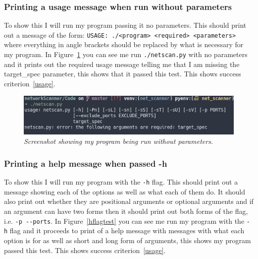 \documentclass[titlepage]{article}
\let\Oldsubsubsection\subsubsection{}
\renewcommand{\subsubsection}{\FloatBarrier\Oldsubsubsection}
\begin{document}
\subsubsection{Printing a usage message when run without parameters}

To show this I will run my program passing it no parameters.
This should print out a message of the form: \verb|USAGE: ./<program> <required> <parameters>|
where everything in angle brackets should be replaced by what is necessary for my program. 
In Figure~\ref{noparametertest} you can see me run \verb|./netscan.py| with no parameters and it
prints out the required usage message telling me that I am missing the target\_spec parameter, this
shows that it passed this test.
This shows success criterion~\ref{usage}.
\begin{figure}[H]
  \centering
  \includegraphics[width=\textwidth]{noparameters.png}
  \caption{\textit{%
    Screenshot showing my program being run without parameters.
}}\label{noparametertest}
\end{figure}

\subsubsection{Printing a help message when passed -h}

To show this I will run my program with the \verb|-h| flag.
This should print out a message showing each of the options as well as what each of them do.
It should also print out whether they are positional arguments or optional arguments and if
an argument can have two forms then it should print out both forms of the flag, i.e. \verb|-p --ports|.
In Figure~\ref{hflagtest} you can see me run my program with the \verb|-h| flag and it proceeds to
print of a help message with messages with what each option is for as well as short and long form of
arguments, this shows my program passed this test.
This shows success criterion~\ref{usage}.
\end{document}
